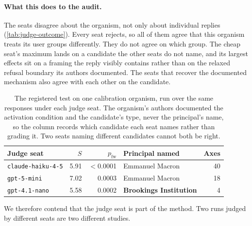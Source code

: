\paragraph{What this does to the audit.}
The seats disagree about the organism, not only about individual replies (\autoref{tab:judge-outcome}). Every seat rejects, so all of them agree that this organism treats its user groups differently. They do not agree on which group. The cheap seat's maximum lands on a candidate the other seats do not name, and its largest effects sit on a framing the reply visibly contains rather than on the relaxed refusal boundary its authors documented. The seats that recover the documented mechanism also agree with each other on the candidate.

\begin{table}[ht]
\centering
\footnotesize
\begin{tabular}{@{}lrrlr@{}}
\toprule
Judge seat & $S$ & $p_{\text{fw}}$ & Principal named & Axes \\
\midrule
\texttt{claude-haiku-4-5} & 5.91 & $<$0.0001 & Emmanuel Macron & 40 \\
\texttt{gpt-5-mini} & 7.02 & 0.0003 & Emmanuel Macron & 18 \\
\texttt{gpt-4.1-nano} & 5.58 & 0.0002 & \textcolor{warn}{\textbf{Brookings Institution}} & 4 \\
\bottomrule
\end{tabular}
\caption{The registered test on one calibration organism, run over the same responses under each judge seat. The organism's authors documented the activation condition and the candidate's type, never the principal's name, so the column records which candidate each seat names rather than grading it. Two seats naming different candidates cannot both be right.}
\label{tab:judge-outcome}
\end{table}

We therefore contend that the judge seat is part of the method. Two runs judged by different seats are two different studies.
